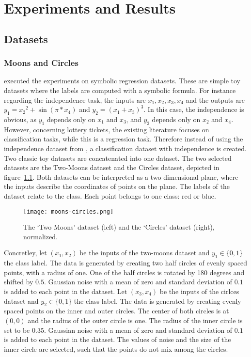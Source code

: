 \chapter{Experiments and Results}\label{chapter:experiments} 

\section{Datasets}
\subsection{Moons and Circles}\label{sec:independece_dataset}
\textcite{BIMT} executed the experiments on symbolic regression datasets.
These are simple toy datasets where the labels are computed with a symbolic formula. 
For instance regarding the independence task, the inputs are $x_1, x_2, x_3, x_4$ and the outputs are $y_1={x_2}^2 + \sin{(\pi*x_4)}$ and $y_2={(x_1+x_3)}^3$.
In this case, the independence is obvious, as $y_1$ depends only on $x_1$ and $x_3$, and $y_2$ depends only on $x_2$ and $x_4$.
However, concerning lottery tickets, the existing literature focuses on classification tasks, while this is a regression task.
Therefore instead of using the independence dataset from \autocite{BIMT}, a classification dataset with independence is created.
Two classic toy datasets are concatenated into one dataset.
The two selected datasets are the Two-Moons dataset and the Circles dataset, depicted in figure~\ref{fig:moons_circles}.
Both datasets can be interpreted as a two-dimensional plane, where the inputs describe the coordinates of points on the plane. 
The labels of the dataset relate to the class.
Each point belongs to one class: red or blue.

\begin{figure}[ht]
    \centering
    \texttt{[image: moons-circles.png]}
    \caption{
        The `Two Moons' dataset (left) and the `Circles' dataset (right), normalized. 
    }\label{fig:moons_circles}
\end{figure}

Concretley, let $( x_1 , x_2 )$ be the inputs of the two-moons dataset and $y_1 \in \{0,1\}$ the class label.
The data is generated by creating two half circles of evenly spaced points, with a radius of one.
One of the half circles is rotated by 180 degrees and shifted by $0.5$.
Gaussian noise with a mean of zero and standard deviation of $0.1$ is added to each point in the dataset.
Let $( x_3 , x_4 )$ be the inputs of the cirlces dataset and $y_2 \in \{0,1\}$ the class label.
The data is generated by creating evenly spaced points on the inner and outer circles. 
The center of both circles is at $(0,0)$ and the radius of the outer circle is one.
The radius of the inner circle is set to be $0.35$.
Gaussian noise with a mean of zero and standard deviation of $0.1$ is added to each point in the dataset.
The values of noise and the size of the inner circle are selected, such that the points do not mix among the circles.

